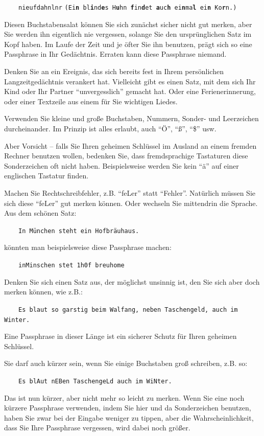 \documentclass[a4paper,11pt, oneside,openright,titlepage,dvips]{scrbook}
\begin{document}
$\qquad$\verb-nieufdahnlnr- 
\texttt{\scriptsize{(Ei\textbf{n}
bl\textbf{i}nd\textbf{e}s H\textbf{u}hn \textbf{f}in\textbf{d}et
\textbf{a}uc\textbf{h} ei\textbf{n}ma\textbf{l} ei\textbf{n}
Ko\textbf{r}n.)}}


Diesen Buchstabensalat können Sie sich zunächst sicher nicht gut
merken, aber Sie werden ihn eigentlich nie vergessen, solange Sie den
ursprünglichen Satz im Kopf haben. Im Laufe der Zeit und je öfter Sie
ihn benutzen, prägt sich so eine Passphrase in Ihr Gedächtnis. Erraten
kann diese Passphrase niemand.


Denken Sie an ein Ereignis, das sich bereits fest in Ihrem
persönlichen Langzeitgedächtnis verankert hat.  Vielleicht gibt es
einen Satz, mit dem sich Ihr Kind oder Ihr Partner "`unvergesslich"'
gemacht hat. Oder eine Ferienerinnerung, oder einer Textzeile aus
einem für Sie wichtigen Liedes.


Verwenden Sie kleine und große Buchstaben, Nummern, Sonder- und
Leerzeichen durcheinander. Im Prinzip ist alles erlaubt, auch "`Ö"',
"`ß"', "`\$"' usw.

Aber Vorsicht -- falls Sie Ihren geheimen Schlüssel im Ausland an
einem fremden Rechner benutzen wollen, bedenken Sie, dass
fremdsprachige Tastaturen diese Sonderzeichen oft nicht haben.
Beispielsweise werden Sie kein "`ä"' auf einer englischen
Tastatur finden.


Machen Sie Rechtschreibfehler, z.B. "`feLer"' statt "`Fehler"'.
Natürlich müssen Sie sich diese "`feLer"' gut merken können.  Oder
wechseln Sie mittendrin die Sprache.  Aus dem schönen Satz:

$\qquad$\verb-In München steht ein Hofbräuhaus.-

könnten man beispielsweise diese Passphrase machen:

$\qquad$\verb-inMinschen stet 1h0f breuhome-

Denken Sie sich einen Satz aus, der möglichst unsinnig ist, den Sie
sich aber doch merken können, wie z.B.:

$\qquad$\verb-Es blaut so garstig beim Walfang, neben Taschengeld, auch im Winter.-

Eine Passphrase in dieser Länge ist ein sicherer Schutz für Ihren
geheimen Schlüssel.

Sie darf auch kürzer sein, wenn Sie einige Buchstaben groß schreiben,
z.B. so:

$\qquad$\verb-Es blAut nEBen TaschengeLd auch im WiNter.-

Das ist nun kürzer, aber nicht mehr so leicht zu merken. 
Wenn Sie eine noch kürzere Passphrase verwenden, 
indem Sie hier und da Sonderzeichen benutzen,
haben Sie zwar bei der Eingabe weniger zu tippen, aber die
Wahrscheinlichkeit, dass Sie Ihre Passphrase vergessen, wird dabei
noch größer.
\end{document}
